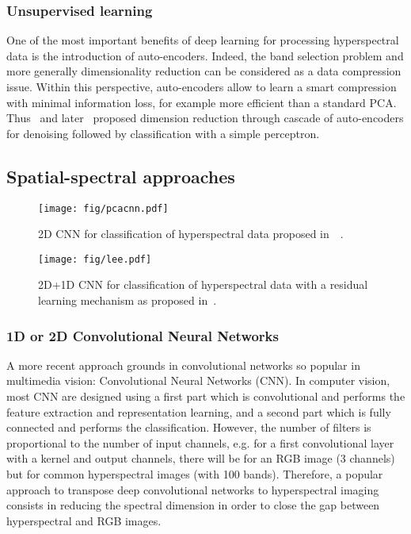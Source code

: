 \documentclass[journal]{IEEEtran}
\begin{document}
\subsubsection{Unsupervised learning} One of the most important benefits of deep learning for processing hyperspectral data is the introduction of auto-encoders. Indeed, the band selection problem and more generally dimensionality reduction can be considered as a data compression issue. Within this perspective, auto-encoders allow to learn a smart compression with minimal information loss, for example more efficient than a standard PCA. Thus~\cite{xing_stacked_2015} and later~\cite{fu_semi-supervised_2016} proposed dimension reduction through cascade of auto-encoders for denoising followed by classification with a simple perceptron. 




\subsection{Spatial-spectral approaches}



\begin{figure}[!tbp]
\begin{center}
\texttt{[image: fig/pcacnn.pdf]}
\caption{2D CNN for classification of hyperspectral data proposed in~~\cite{makantasis_deep_2015}.}
\label{fig:makantasis2d}
\end{center}
\end{figure}







\begin{figure*}[!tbp]
\begin{center}
\texttt{[image: fig/lee.pdf]}
\caption{2D+1D CNN for classification of hyperspectral data with a residual learning mechanism as proposed in~\cite{lee_kwon-contextualCNN4HSI_TIP2017}.}
\label{fig:lee3d}
\end{center}
\end{figure*}


\subsubsection{1D or 2D Convolutional Neural Networks}
A more recent approach grounds in convolutional networks so popular in multimedia vision: Convolutional Neural Networks (CNN). In computer vision, most CNN are designed using a first part which is convolutional and performs the feature extraction and representation learning, and a second part which is fully connected and performs the classification. However, the number of filters is proportional to the number of input channels, e.g. for a first convolutional layer with a kernel  and  output channels, there will be  for an RGB image (3 channels) but  for common hyperspectral images (with 100 bands). Therefore, a popular approach to transpose deep convolutional networks to hyperspectral imaging consists in reducing the spectral dimension in order to close the gap between hyperspectral and RGB images.
\end{document}
